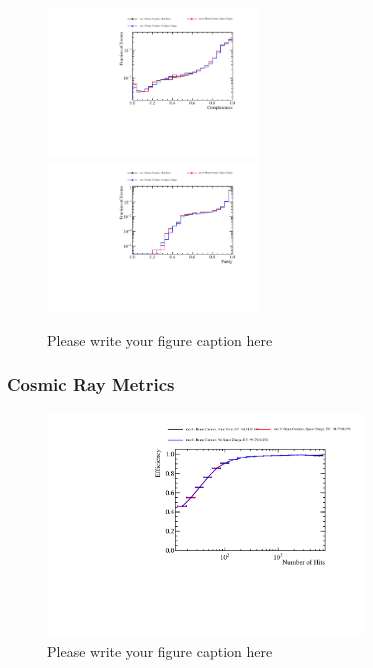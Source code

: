 \begin{figure}
\includegraphics[width=0.5\textwidth]{Figures/Metrics/MC/Beam/BeamParticleCompleteness.pdf}
\includegraphics[width=0.5\textwidth]{Figures/Metrics/MC/Beam/BeamParticlePurity.pdf}
\caption{Please write your figure caption here}
\label{fig:2}
\end{figure}

\subsubsection{Cosmic Ray Metrics}

\begin{figure}
\includegraphics[width=0.75\textwidth]{Figures/Metrics/MC/Cosmics/CosmicRayEfficiencyVsNHits.pdf}
\caption{Please write your figure caption here}
\label{fig:3}
\end{figure}


